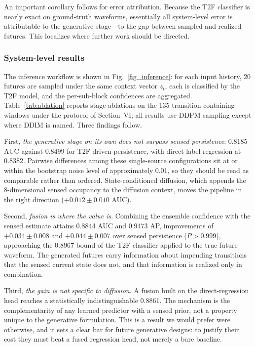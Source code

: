 \documentclass[lettersize,journal]{IEEEtran}
\begin{document}
An important corollary follows for error attribution. Because the T2F
classifier is nearly exact on ground-truth waveforms, essentially all
system-level error is attributable to the generative stage---to the gap
between sampled and realized futures. This localizes where further work
should be directed.

\subsubsection{System-level results}
\label{sec:system_results}
The inference workflow is shown in Fig.~\ref{fig_inference}: for each input
history, 20 futures are sampled under the same context vector $z_t$, each is
classified by the T2F model, and the per-sub-block confidences are aggregated.
Table~\ref{tab:ablation} reports stage ablations on the 135
transition-containing windows under the protocol of Section~VI; all results use
DDPM sampling except where DDIM is named. Three findings follow.

First, \emph{the generative stage on its own does not surpass sensed
persistence}: 0.8185 AUC against 0.8499 for T2F-driven persistence, with
direct label regression at 0.8382. Pairwise differences among these
single-source configurations sit at or within the bootstrap noise level
of approximately 0.01, so they should be read as comparable rather than
ordered. State-conditioned diffusion, which appends the 8-dimensional
sensed occupancy to the diffusion context, moves the pipeline in the
right direction ($+0.012 \pm 0.010$ AUC).

Second, \emph{fusion is where the value is}. Combining the ensemble
confidence with the sensed estimate attains 0.8844 AUC and 0.9473 AP,
improvements of $+0.034 \pm 0.008$ and $+0.044 \pm 0.007$ over sensed
persistence ($P > 0.999$), approaching the 0.8967 bound of the T2F
classifier applied to the true future waveform. The generated futures
carry information about impending transitions that the sensed current
state does not, and that information is realized only in combination.

Third, \emph{the gain is not specific to diffusion}. A fusion built on
the direct-regression head reaches a statistically indistinguishable
0.8861. The mechanism is the complementarity of any learned predictor
with a sensed prior, not a property unique to the generative
formulation. This is a result we would prefer were otherwise, and it
sets a clear bar for future generative designs: to justify their cost
they must beat a fused regression head, not merely a bare baseline.
\end{document}
